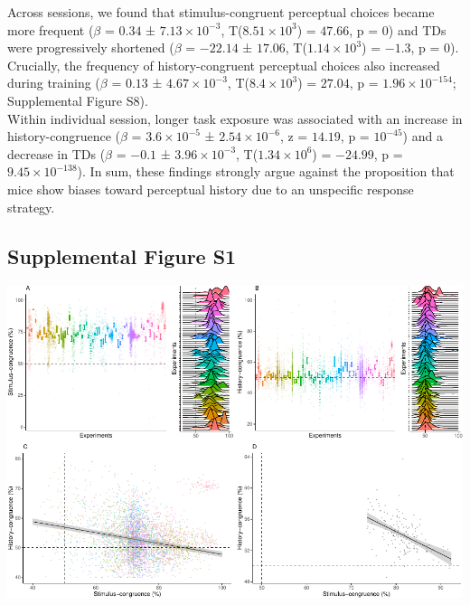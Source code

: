 \documentclass[
]{article}
\begin{document}
Across sessions, we found that stimulus-congruent perceptual choices
became more frequent (\(\beta\) = \(0.34\) ±
\(\ensuremath{7.13\times 10^{-3}}\),
T(\(\ensuremath{8.51\times 10^{3}}\)) = \(47.66\), p = \(0\)) and TDs
were progressively shortened (\(\beta\) = \(-22.14\) ± \(17.06\),
T(\(\ensuremath{1.14\times 10^{3}}\)) = \(-1.3\), p = \(0\)). Crucially,
the frequency of history-congruent perceptual choices also increased
during training (\(\beta\) = \(0.13\) ±
\(\ensuremath{4.67\times 10^{-3}}\),
T(\(\ensuremath{8.4\times 10^{3}}\)) = \(27.04\), p =
\(\ensuremath{1.96\times 10^{-154}}\); Supplemental Figure S8).\\
Within individual session, longer task exposure was associated with an
increase in history-congruence (\(\beta\) =
\(\ensuremath{3.6\times 10^{-5}}\) ±
\(\ensuremath{2.54\times 10^{-6}}\), z = \(14.19\), p =
\(\ensuremath{10^{-45}}\)) and a decrease in TDs (\(\beta\) = \(-0.1\) ±
\(\ensuremath{3.96\times 10^{-3}}\),
T(\(\ensuremath{1.34\times 10^{6}}\)) = \(-24.99\), p =
\(\ensuremath{9.45\times 10^{-138}}\)). In sum, these findings strongly
argue against the proposition that mice show biases toward perceptual
history due to an unspecific response strategy.

\newpage

\hypertarget{supplemental-figure-s1}{%
\subsection{Supplemental Figure S1}\label{supplemental-figure-s1}}

\includegraphics{modes_mouse_rev1b_files/figure-latex/Supplememtal_Figure_S1-1.pdf}
\end{document}
